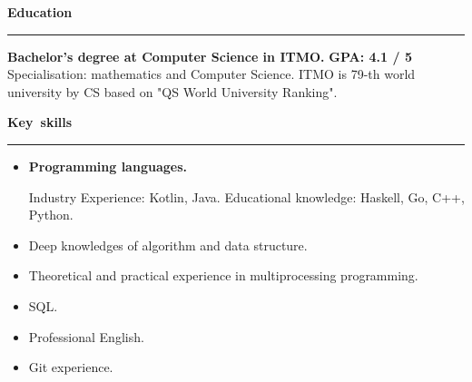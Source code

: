 \documentclass[10pt, a4paper]{report}
\begin{document}
 \par\hbox{\large\textbf{Education}}\kern5pt\hrule\kern5pt

    \textbf{Bachelor's degree at Computer Science in ITMO.}
    \hfill
    \textbf{ GPA: 4.1 / 5} \\
        Specialisation: mathematics and Computer Science. ITMO is 79-th world university by CS based on "QS World University Ranking".\\


    \par\hbox{\large\textbf{Key skills}}\kern5pt\hrule\kern5pt

    \begin{itemize}

        \item \textbf{Programming languages.}

        Industry Experience: Kotlin, Java. Educational knowledge: Haskell, Go, C++, Python.

        \item Deep knowledges of algorithm and data structure.
        \item Theoretical and practical experience in multiprocessing programming.
        \item SQL.
        \item Professional English.
        \item Git experience.
        \\
    \end{itemize}
\end{document}

